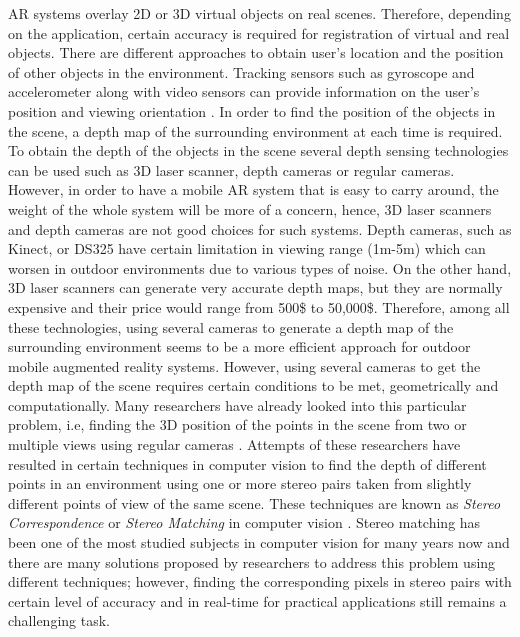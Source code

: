 AR systems overlay 2D or 3D virtual objects on real scenes. Therefore, depending on the application, certain accuracy is required for 
registration of virtual and real objects. There are different approaches to obtain user's location and the position of other objects in the environment.
Tracking sensors such as gyroscope and accelerometer along with video sensors can provide information on the user's position and viewing orientation \cite{azum01}.
In order to find the position of the objects in the scene, a depth map of the surrounding environment at each time is required. To obtain the depth of the 
objects in the scene several depth sensing technologies can be used such as 3D laser scanner, depth cameras or regular cameras. However, in order to have a mobile AR
system that is easy to carry around, the weight of the whole system will be more of a concern, hence, 3D laser scanners and depth cameras are not good choices for such systems.
Depth cameras, such as Kinect, or DS325 have certain limitation in viewing range (1m-5m) which can worsen in outdoor environments due to various types of noise. 
On the other hand, 3D laser scanners can
generate very accurate depth maps, but they are normally expensive and their price would range from 500\$ to 50,000\$. Therefore, among all these technologies, using several 
cameras to generate a depth map of the surrounding environment seems to be a more efficient approach for outdoor mobile augmented reality systems. {\newline}
However, using several cameras to get the depth map of the scene requires certain conditions to be met, geometrically and computationally. Many researchers have already looked into
this particular problem, i.e, finding the 3D position of the points in the scene from two or multiple views using regular cameras \cite{sze11}. Attempts of these researchers have resulted in
certain techniques in computer vision to find the depth of different points in an environment using one or more stereo pairs taken from slightly different points of view of the same scene.
These techniques are known as {\it Stereo Correspondence} or {\it Stereo Matching} in computer vision \cite{sze11}. Stereo matching has been one of the most studied subjects in computer vision for 
many years now and there are many solutions proposed by researchers to address this problem using different techniques; however, finding the corresponding pixels in stereo pairs with certain level of 
accuracy and in real-time for practical applications still remains a challenging task. {\newline}

